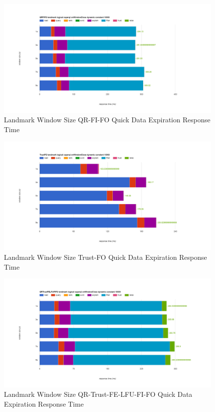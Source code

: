 \begin{figure}[!htbp]
	\centering
    \includegraphics[width=\textwidth]{img/app3-land-ws-qrfifo-quick-r.png}
    \caption{Landmark Window Size QR-FI-FO Quick Data Expiration Response Time}
\end{figure}
\begin{figure}[!htbp]
	\centering
    \includegraphics[width=\textwidth]{img/app3-land-ws-trustfo-quick-r.png}
    \caption{Landmark Window Size Trust-FO Quick Data Expiration Response Time}
\end{figure}
\begin{figure}[!htbp]
	\centering
    \includegraphics[width=\textwidth]{img/app3-land-ws-qrtrustfelfufifo-quick-r.png}
    \caption{Landmark Window Size QR-Trust-FE-LFU-FI-FO Quick Data Expiration Response Time}
\end{figure}

